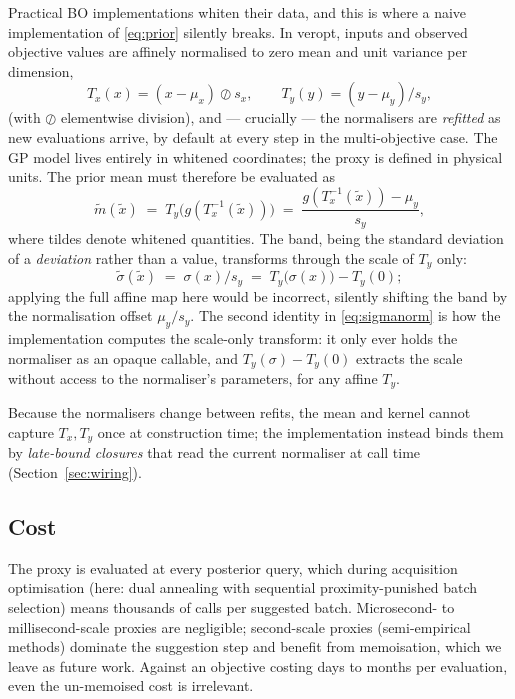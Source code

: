 \documentclass[11pt,a4paper]{article}
\newcommand{\veropt}{\textsf{veropt}}
\begin{document}
Practical BO implementations whiten their data, and this is where a naive
implementation of \eqref{eq:prior} silently breaks. In \veropt{}, inputs and
observed objective values are affinely normalised to zero mean and unit
variance per dimension,
\begin{equation}
  T_x(x) = (x - \mu_x) \oslash s_x,
  \qquad
  T_y(y) = (y - \mu_y) / s_y,
\end{equation}
(with $\oslash$ elementwise division), and --- crucially --- the normalisers
are \emph{refitted} as new evaluations arrive, by default at every step in
the multi-objective case. The GP model lives entirely in whitened
coordinates; the proxy is defined in physical units. The prior mean must
therefore be evaluated as
\begin{equation}
  \label{eq:meannorm}
  \tilde m(\tilde x) \;=\; T_y\bigl(g(T_x^{-1}(\tilde x))\bigr)
  \;=\; \frac{g(T_x^{-1}(\tilde x)) - \mu_y}{s_y},
\end{equation}
where tildes denote whitened quantities. The band, being the standard
deviation of a \emph{deviation} rather than a value, transforms through the
scale of $T_y$ only:
\begin{equation}
  \label{eq:sigmanorm}
  \tilde\sigma(\tilde x) \;=\; \sigma(x) / s_y
  \;=\; T_y\bigl(\sigma(x)\bigr) - T_y(0);
\end{equation}
applying the full affine map here would be incorrect, silently shifting the
band by the normalisation offset $\mu_y / s_y$. The second identity in
\eqref{eq:sigmanorm} is how the implementation computes the scale-only
transform: it only ever holds the normaliser as an opaque callable, and
$T_y(\sigma) - T_y(0)$ extracts the scale without access to the normaliser's
parameters, for any affine $T_y$.

Because the normalisers change between refits, the mean and kernel cannot
capture $T_x, T_y$ once at construction time; the implementation instead
binds them by \emph{late-bound closures} that read the current normaliser at
call time (Section~\ref{sec:wiring}).

\subsection{Cost}

The proxy is evaluated at every posterior query, which during acquisition
optimisation (here: dual annealing with sequential proximity-punished batch
selection) means thousands of calls per suggested batch. Microsecond- to
millisecond-scale proxies are negligible; second-scale proxies (semi-empirical
methods) dominate the suggestion step and benefit from memoisation, which we
leave as future work. Against an objective costing days to months per
evaluation, even the un-memoised cost is irrelevant.
\end{document}
